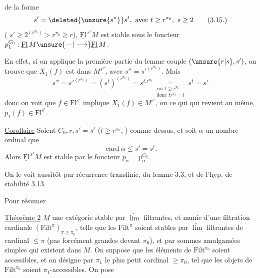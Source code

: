 
de la forme
\[
s'=\deleted{\unsure{s^{\pi}}}s^t,\ \text{avec }t\geq r^{\pi_0},\ s\geq2
\tag*{(3.15.)}
\]
(\uline{} $s'\geq2^{(r^{\pi_0})}>r^{\pi_0}\geq r$), $\underline{\mathrm{Fl}}^{\,s'}M$ est stable sous le
foncteur $p_1^{C_0}:\underline{\mathrm{Fl}}\,M\unsure{\text{---}|\longrightarrow}\underline{\mathrm{Fl}}\,M$.

En effet, si on applique la première partie du
lemme  couple $(\unsure{r|s},s')$, on trouve que
$X_1(f)$ est dans $M^{s''}$, avec $s''={s'}^{(r^{\pi_0})}$. Mais
\[
s''={s'}^{(r^{\pi_0})}=(s^t)^{(r^{\pi_0})}
=s^{t.r^{\pi_0}}\underset{\substack{\text{car }t\geq r^{\pi_0}\\\text{donc }tr^{\pi_0}=t}}{=}
s^t=s'
\]
donc on voit que $f\in\mathrm{Fl}^{s'}$ implique $X_1(f)\in M^{s'}$, ou
ce qui qui revient au même, $p_1(f)\in\mathrm{Fl}^{s'}$.

\uline{Corollaire} Soient $C_0,r,s'=s^t$ ($t\geq r^{\pi_0}$, ) comme
dessus, et soit $\alpha$ un nombre ordinal  
 que
\[
\operatorname{card}\alpha\leq s'=s^t.
\]
Alors $\underline{\mathrm{Fl}}^{\,s'}M$ est stable par le foncteur $p_\alpha=p_\alpha^{C_0}$.

On le voit aussitôt par récurrence transfinie,
   du lemme 3.3, et de l'hyp. de
stabilité 3.13.

Pour résumer

\uline{Théorème 2}  $M$ une catégorie stable par  $\underrightarrow{\lim}$
filtrantes, et munie d'une filtration cardinale
$(\mathrm{Filt}^\pi)_{\pi\geq\pi_0}$, telle que les $\mathrm{Filt}^\pi$ soient stables
par $\underrightarrow{\lim}$ filtrantes de cardinal $\leq\pi$ (pas forcément
grandes devant $\pi_0$), et par  sommes amalgamées simples
qui existent dans $M$. On suppose que les éléments
de $\mathrm{Filt}^{\pi_0}$ soient accessibles, et on désigne par
$\pi_1$ le plus petit cardinal $\geq\pi_0$, tel que les objets de
$\mathrm{Filt}^{\pi_0}$ soient $\pi_1$-accessibles. On pose 
